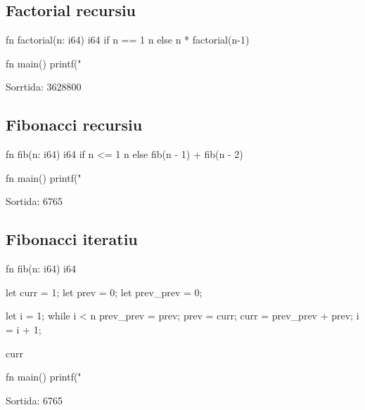 ﻿\documentclass{article}
\begin{document}
\newpage
\subsection{Factorial recursiu}
\begin{code}
fn factorial(n: i64) i64 {
    if n == 1 {
        n
    } else {
        n * factorial(n-1)
    }
}

fn main() {
    printf("%
}
\end{code}

Sorrtida: 3628800

\subsection{Fibonacci recursiu}
\begin{code}
fn fib(n: i64) i64 {
    if n <= 1 {
        n
    } else {
        fib(n - 1) + fib(n - 2)
    }
}

fn main() {
    printf("%
}
\end{code}

Sortida: 6765

\subsection{Fibonacci iteratiu}

\begin{code}
fn fib(n: i64) i64 {
    let curr = 1;
    let prev = 0;
    let prev_prev = 0;

    let i = 1;
    while i < n {
        prev_prev = prev;
        prev = curr;
        curr = prev_prev + prev;
        i = i + 1;
    }

    curr
}

fn main() {
    printf("%
}
\end{code}

Sortida: 6765
\end{document}
